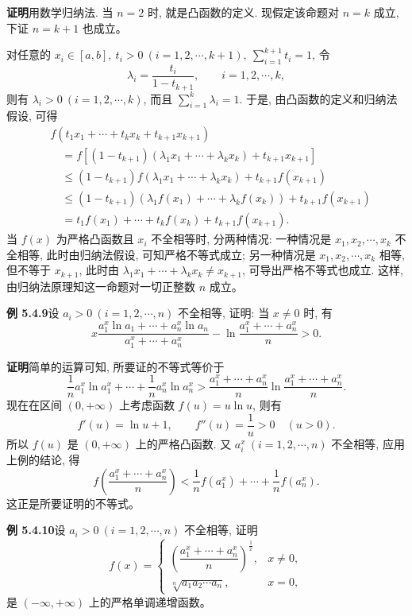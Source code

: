 \documentclass[UTF8, 12pt, fontset=fandol, oneside]{ctexart}
\begin{document}
\noindent\textbf{证明}\quad 用数学归纳法. 当 $n=2$ 时, 就是凸函数的定义. 现假定该命题对 $n=k$ 成立, 下证 $n=k+1$ 也成立。

对任意的 $x_i\in[a,b],\ t_i>0\ (i=1,2,\cdots,k+1),\ \sum_{i=1}^{k+1}t_i=1$, 令
\[
  \lambda_i=\frac{t_i}{1-t_{k+1}},\qquad i=1,2,\cdots,k,
\]
则有 $\lambda_i>0\ (i=1,2,\cdots,k)$, 而且 $\sum_{i=1}^k\lambda_i=1$. 于是, 由凸函数的定义和归纳法假设, 可得
\[
\begin{aligned}
  &f(t_1x_1+\cdots+t_kx_k+t_{k+1}x_{k+1})\\
  &\quad=f[(1-t_{k+1})(\lambda_1x_1+\cdots+\lambda_kx_k)+t_{k+1}x_{k+1}]\\
  &\quad\leqslant(1-t_{k+1})f(\lambda_1x_1+\cdots+\lambda_kx_k)+t_{k+1}f(x_{k+1})\\
  &\quad\leqslant(1-t_{k+1})(\lambda_1f(x_1)+\cdots+\lambda_kf(x_k))+t_{k+1}f(x_{k+1})\\
  &\quad=t_1f(x_1)+\cdots+t_kf(x_k)+t_{k+1}f(x_{k+1}).
\end{aligned}
\]
当 $f(x)$ 为严格凸函数且 $x_i$ 不全相等时, 分两种情况: 一种情况是 $x_1,x_2,\cdots,x_k$ 不全相等, 此时由归纳法假设, 可知严格不等式成立; 另一种情况是 $x_1,x_2,\cdots,x_k$ 相等, 但不等于 $x_{k+1}$, 此时由 $\lambda_1x_1+\cdots+\lambda_kx_k\ne x_{k+1}$, 可导出严格不等式也成立. 这样, 由归纳法原理知这一命题对一切正整数 $n$ 成立。

\noindent\textbf{例 5.4.9}\quad 设 $a_i>0\ (i=1,2,\cdots,n)$ 不全相等, 证明: 当 $x\ne0$ 时, 有
\[
  x\frac{a_1^x\ln a_1+\cdots+a_n^x\ln a_n}{a_1^x+\cdots+a_n^x}
  -\ln\frac{a_1^x+\cdots+a_n^x}{n}>0.
\]

\noindent\textbf{证明}\quad 简单的运算可知, 所要证的不等式等价于
\[
  \frac1n a_1^x\ln a_1^x+\cdots+\frac1n a_n^x\ln a_n^x
  >\frac{a_1^x+\cdots+a_n^x}{n}\ln\frac{a_1^x+\cdots+a_n^x}{n}.
\]
现在在区间 $(0,+\infty)$ 上考虑函数 $f(u)=u\ln u$, 则有
\[
  f'(u)=\ln u+1,\qquad f''(u)=\frac1u>0\quad (u>0).
\]
所以 $f(u)$ 是 $(0,+\infty)$ 上的严格凸函数. 又 $a_i^x\ (i=1,2,\cdots,n)$ 不全相等, 应用上例的结论, 得
\[
  f\left(\frac{a_1^x+\cdots+a_n^x}{n}\right)
  <\frac1n f(a_1^x)+\cdots+\frac1n f(a_n^x).
\]
这正是所要证明的不等式。

\noindent\textbf{例 5.4.10}\quad 设 $a_i>0\ (i=1,2,\cdots,n)$ 不全相等, 证明
\[
  f(x)=
  \begin{cases}
    \left(\dfrac{a_1^x+\cdots+a_n^x}{n}\right)^{\frac1x}, & x\ne0,\\[6pt]
    \sqrt[n]{a_1a_2\cdots a_n}, & x=0,
  \end{cases}
\]
是 $(-\infty,+\infty)$ 上的严格单调递增函数。
\end{document}
